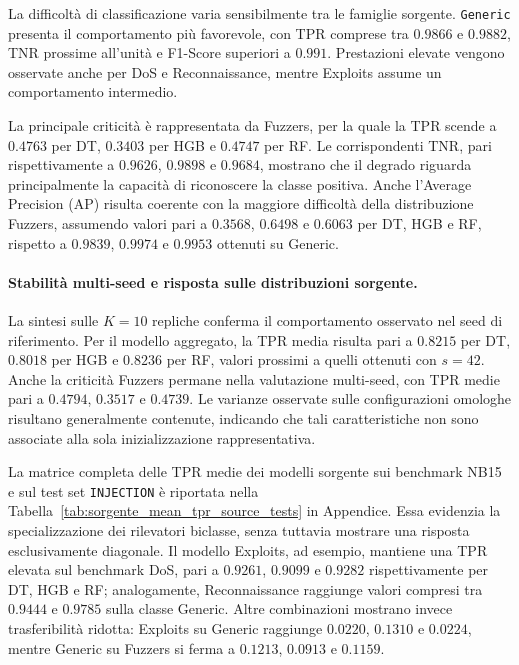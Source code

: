 La difficoltà di classificazione varia sensibilmente tra le famiglie sorgente. 
\texttt{Generic} presenta il comportamento più favorevole, con TPR comprese tra $0.9866$ e $0.9882$, TNR prossime all'unità e F1-Score superiori a $0.991$. 
Prestazioni elevate vengono osservate anche per DoS e Reconnaissance, mentre Exploits assume un comportamento intermedio.

La principale criticità è rappresentata da Fuzzers, per la quale la TPR scende a $0.4763$ per DT, $0.3403$ per HGB e $0.4747$ per RF. 
Le corrispondenti TNR, pari rispettivamente a $0.9626$, $0.9898$ e $0.9684$, mostrano che il degrado riguarda principalmente la capacità di riconoscere la classe positiva. 
Anche l'Average Precision (AP) risulta coerente con la maggiore difficoltà della distribuzione Fuzzers, assumendo valori pari a $0.3568$, $0.6498$ e $0.6063$ per DT, HGB e RF, rispetto a $0.9839$, $0.9974$ e $0.9953$ ottenuti su Generic.

\paragraph{Stabilità multi-seed e risposta sulle distribuzioni sorgente.}
La sintesi sulle $K=10$ repliche conferma il comportamento osservato nel seed di riferimento. 
Per il modello aggregato, la TPR media risulta pari a $0.8215$ per DT, $0.8018$ per HGB e $0.8236$ per RF, valori prossimi a quelli ottenuti con $s=42$. 
Anche la criticità Fuzzers permane nella valutazione multi-seed, con TPR medie pari a $0.4794$, $0.3517$ e $0.4739$.
Le varianze osservate sulle configurazioni omologhe risultano generalmente contenute, indicando che tali caratteristiche non sono associate alla sola inizializzazione rappresentativa.

La matrice completa delle TPR medie dei modelli sorgente sui benchmark NB15 e sul test set \texttt{INJECTION} è riportata nella Tabella~\ref{tab:sorgente_mean_tpr_source_tests} in Appendice. 
Essa evidenzia la specializzazione dei rilevatori biclasse, senza tuttavia mostrare una risposta esclusivamente diagonale. 
Il modello Exploits, ad esempio, mantiene una TPR elevata sul benchmark DoS, pari a $0.9261$, $0.9099$ e $0.9282$ rispettivamente per DT, HGB e RF; analogamente, Reconnaissance raggiunge valori compresi tra $0.9444$ e $0.9785$ sulla classe Generic. 
Altre combinazioni mostrano invece trasferibilità ridotta: Exploits su Generic raggiunge $0.0220$, $0.1310$ e $0.0224$, mentre Generic su Fuzzers si ferma a $0.1213$, $0.0913$ e $0.1159$.

